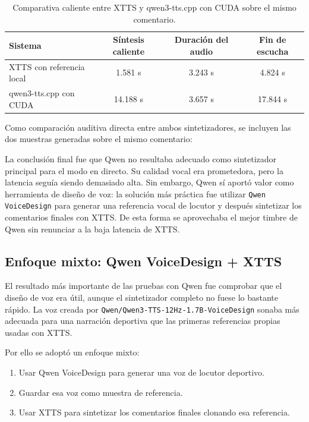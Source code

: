 \begin{table}[ht]
\centering
\begin{tabular}{lccc}
\toprule
Sistema & Síntesis caliente & Duración del audio & Fin de escucha \\
\midrule
XTTS con referencia local & 1.581 s & 3.243 s & 4.824 s \\
qwen3-tts.cpp con CUDA & 14.188 s & 3.657 s & 17.844 s \\
\bottomrule
\end{tabular}
\caption{Comparativa caliente entre XTTS y qwen3-tts.cpp con CUDA sobre el mismo comentario.}
\label{tab:xtts-qwen-cpp}
\end{table}

Como comparación auditiva directa entre ambos sintetizadores, se incluyen las dos muestras generadas sobre el mismo comentario:

\begin{center}
\qquad
{}
\end{center}

La conclusión final fue que Qwen no resultaba adecuado como sintetizador principal para el modo en directo. Su calidad vocal era prometedora, pero la latencia seguía siendo demasiado alta. Sin embargo, Qwen sí aportó valor como herramienta de diseño de voz: la solución más práctica fue utilizar \texttt{Qwen VoiceDesign} para generar una referencia vocal de locutor y después sintetizar los comentarios finales con XTTS. De esta forma se aprovechaba el mejor timbre de Qwen sin renunciar a la baja latencia de XTTS.

\subsection{Enfoque mixto: Qwen VoiceDesign + XTTS}

El resultado más importante de las pruebas con Qwen fue comprobar que el diseño de voz era útil, aunque el sintetizador completo no fuese lo bastante rápido. La voz creada por \texttt{Qwen/Qwen3-TTS-12Hz-1.7B-VoiceDesign} sonaba más adecuada para una narración deportiva que las primeras referencias propias usadas con XTTS.

Por ello se adoptó un enfoque mixto:

\begin{enumerate}
    \item Usar Qwen VoiceDesign para generar una voz de locutor deportivo.
    \item Guardar esa voz como muestra de referencia.
    \item Usar XTTS para sintetizar los comentarios finales clonando esa referencia.
\end{enumerate}

